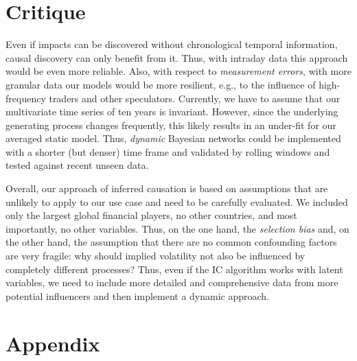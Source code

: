 \documentclass[twoside,twocolumn]{article}
\begin{document}
\section{Critique}
Even if impacts can be discovered without chronological temporal information, causal discovery can only benefit from it. Thus, with intraday data this approach would be even more reliable. Also, with respect to \textit{measurement errors}, with more granular data our models would be more resilient, e.g., to the influence of high-frequency traders and other speculators.  Currently, we have to assume that our multivariate time series of ten years is invariant. However, since the underlying generating process changes frequently, this likely results in an under-fit  for our averaged static model.  Thus, \textit{dynamic} Bayesian networks could be implemented with a shorter (but denser) time frame and validated by rolling windows and tested against recent unseen data. \cite{Pearl1991}  \cite{Glymour2019}  \cite{Nagarajan2014} 

Overall, our approach of inferred causation is based on assumptions that are unlikely to apply to our use case and need to be carefully evaluated.  We included only the largest global financial players, no other countries, and most importantly, no other variables. Thus, on the one hand, the \textit{selection bias}  and, on the other hand, the assumption that there are no common confounding factors are very fragile: why should implied volatility not also be influenced by completely different processes? Thus, even if the IC algorithm works with latent variables, we need to include more detailed and comprehensive data from more potential influencers and then implement a dynamic approach. \cite{Borgelt1999} \cite{Glymour2019} \cite{Pearl1991}


\newpage
\null
\newpage
\onecolumn
\section*{Appendix}
\end{document}

